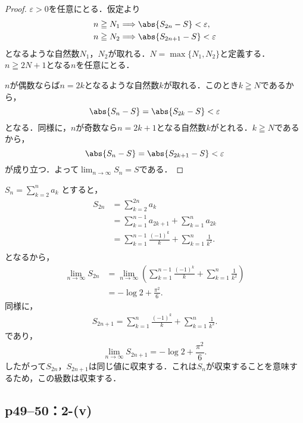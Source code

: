 \documentclass[a4paper,10pt,fleqn]{ltjsarticle}
\begin{document}
\begin{proof}
    $\varepsilon >0$を任意にとる．仮定より
    \begin{align*}
         & n \geqq N_1 \Longrightarrow \abs{S_{2n}-S} < \varepsilon,  \\
         & n \geqq N_2 \Longrightarrow \abs{S_{2n+1}-S} < \varepsilon
    \end{align*}
    となるような自然数$N_1$，$N_2$が取れる．$N=\max\{N_1, N_2\}$と定義する．$n \geqq 2N +1$となる$n$を任意にとる．

    $n$が偶数ならば$n =2k$となるような自然数$k$が取れる．このとき$k \geqq N$であるから，
    \[
        \abs{S_n -S}=\abs{S_{2k}-S}<\varepsilon
    \]
    となる．同様に，$n$が奇数なら$n =2k+1$となる自然数$k$がとれる．$k \geqq N$であるから，
    \[
        \abs{S_n -S}=\abs{S_{2k+1}-S}<\varepsilon
    \]
    が成り立つ．よって$\lim_{n \to \infty} S_n =S$である．
\end{proof}

\begin{screen}
    $S_{n} = \sum ^{n}_{k=2} a_k$ とすると，
    \begin{align*}
        S_{2n} & = \sum ^{2n}_{k=2} a_{k}                                              \\
               & = \sum ^{n-1}_{k=1} a_{2k+1} + \sum ^{n}_{k=1} a_{2k}                 \\
               & = \sum ^{n-1}_{k=1} \frac{(-1)^k}{k} + \sum ^{n}_{k=1} \frac{1}{k^2}. \\
    \end{align*}
    となるから，
    \begin{align*}
        \lim_{n \to \infty} S_{2n} & =\lim_{n \to \infty} \left (\sum ^{n-1}_{k=1} \frac{(-1)^k}{k} + \sum ^{n}_{k=1} \frac{1}{k^2} \right ) \\
                                   & = -\log 2 + \frac{\pi^2}{6}.
    \end{align*}
    同様に，
    \begin{align*}
        S_{2n+1} = \sum ^{n}_{k=1} \frac{(-1)^k}{k} + \sum ^{n}_{k=1} \frac{1}{k^2}.
    \end{align*}
    であり，
    \[
        \lim_{n \to \infty} S_{2n+1} = -\log 2 + \frac{\pi^2}{6}.
    \]
    したがって$S_{2n}$，$S_{2n+1}$は同じ値に収束する．これは$S_{n}$が収束することを意味するため，この級数は収束する．
\end{screen}


\subsection*{p49--50：2-(v)}
\end{document}

